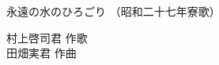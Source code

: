 \documentclass[10pt,b5j]{tarticle} %
\begin{document}
\begin{minipage}[c]{0.7\hsize} %
    \begin{center}
        {\LARGE
            永遠の水のひろごり %
        }
        {\small 
            （昭和二十七年寮歌） %
        }
    \end{center}
\end{minipage}
\begin{minipage}[c]{0.3\hsize} %
    \begin{flushright} %
        村上啓司君 作歌\\田畑実君 作曲 %
    \end{flushright}
\end{minipage}
\end{document}
